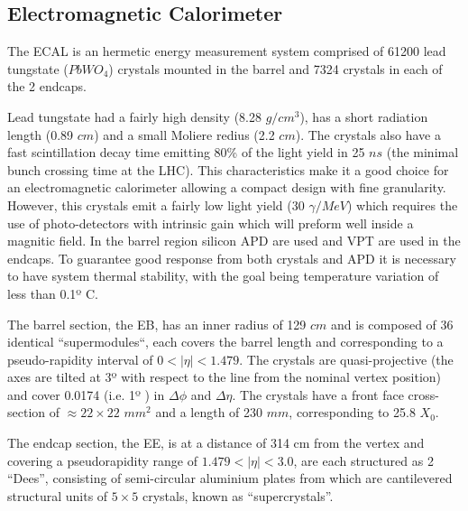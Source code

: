 \subsection{Electromagnetic Calorimeter}
\label{SUBSECTION:ExperimentalApparatus_CMS_ECAL}

The \gls{ECAL} is an hermetic energy measurement system comprised of 61200 lead tungstate ($PbWO_4$) crystals mounted in the barrel and 7324 crystals in each of the 2 endcaps.

Lead tungstate had a fairly high density (8.28 $g/cm^3$), has a short radiation length (0.89 $cm$) and a small Moliere redius (2.2 $cm$). The crystals also have a fast scintillation decay time emitting 80\% of the light yield in 25 $ns$ (the minimal bunch crossing time at the LHC). This characteristics make it a good choice for an electromagnetic calorimeter allowing a compact design with fine granularity. However, this crystals emit a fairly low light yield (30 $\gamma/MeV$) which requires the use of photo-detectors with intrinsic gain which will preform well inside a magnitic field. In the barrel region silicon \gls{APD} are used and \gls{VPT} are used in the endcaps. To guarantee good response from both crystals and \gls{APD} it is necessary to have system thermal stability, with the goal being temperature variation of less than 0.1º C.

The barrel section, the \gls{EB}, has an inner radius of 129 $cm$ and is composed of 36 identical ``supermodules``, each covers the barrel length and corresponding to a pseudo-rapidity interval of $0<|\eta|<1.479$. The crystals are quasi-projective (the axes are tilted at 3º with respect to the line from the nominal vertex position) and cover 0.0174 (i.e. 1º ) in $\Delta\phi$ and $\Delta\eta$. The crystals have a front face cross-section of $\approx 22\times22$ $mm^2$ and a length of 230 $mm$, corresponding to 25.8 $X_0$.

The endcap section, the \gls{EE}, is at a distance of 314 cm from the vertex and covering a pseudorapidity range of $1.479<|\eta|<3.0$, are each structured as 2 “Dees”, consisting of semi-circular aluminium plates from which are cantilevered structural units of $5\times5$ crystals, known as “supercrystals”.

